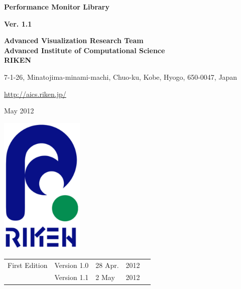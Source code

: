 \documentclass[a4paper,10pt,oneside,fleqn]{jsbook}
\begin{document}
\begin{titlepage}
\begin{center}
\vspace*{2cm}
{\huge \textbf{Performance Monitor Library}}\\
\vspace{1cm}

{\large \textbf{Ver. 1.1}}\\
\vspace{1.0cm}

{\large \textbf{Advanced Visualization Research Team}\\
\large \textbf{Advanced Institute of Computational Science}\\
\large \textbf{RIKEN}\\
\vspace{1cm}
}

{7-1-26, Minatojima-minami-machi, Chuo-ku, Kobe, Hyogo, 650-0047, Japan}\\
\vspace{0.5cm}

\url{http://aics.riken.jp/}\\

\vspace{1.0cm}




May 2012\\
\vspace{3cm}

\includegraphics[width=4cm,bb=-80 0 220 500]{RIKEN_logo_300x500.eps}

\end{center}
\end{titlepage}
\newpage

%
\frontmatter

\begin{tabular}{llllr}
First Edition  &  Version 1.0  & 28 Apr. & 2012\\
               &  Version 1.1  &  2 May  & 2012


\end{tabular}
\end{document}
